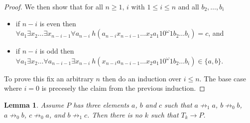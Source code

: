 \documentclass[a4paper]{article}
\newtheorem{lemma}[theorem]{Lemma}
\begin{document}
\begin{proof}
We then show that for all $n \geq 1$, $i$ with $1 \leq i \leq n$ and all $b_2,\dots,b_i$
\begin{itemize}
 \item if $n - i$ is even then $\forall a_1 \exists x_2 \dots \exists
x_{n - i - 1} \forall a_{n - i} \  h(a_{n - i} x_{n - i - 1} \dots x_2
a_1 1 0^\omega 1 b_2 \dots b_i) = c$, and
 \item if $n - i$ is odd then $\forall a_1 \exists x_2 
\dots \forall a_{n - i - 1} \exists x_{n - i} \
h(x_{n - i} a_{n - i - 1} \dots
x_2 a_1 1 0^\omega 1 b_2 \dots b_i) \in \{a,b\}$.
\end{itemize}
To prove this fix an arbitrary $n$ then do an induction over $i \leq n$.
The base case where $i = 0$ is precesely the claim from the previous
induction.


\end{proof}

\begin{lemma} \label{second killer lemma}
 Assume $P$ has three elements $a$, $b$ and $c$ such that $a \not
\rightarrow_1 a$, $b \not \rightarrow_0 b$, $a \not \rightarrow_0 b$, $c
\not \rightarrow_0 a$, and $b \not \rightarrow_1 c$. Then there is no
$k$ such that $T_k \to P$.
\end{lemma}
\end{document}
